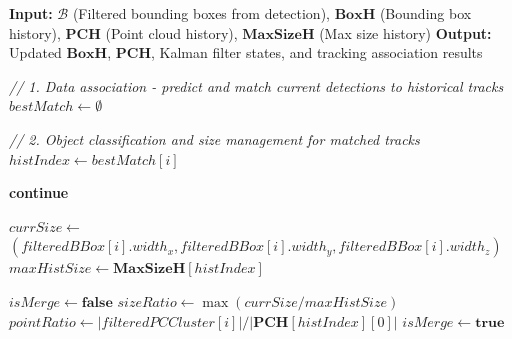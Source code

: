 \documentclass[14pt,a4paper]{article}
\begin{document}

\begin{algorithm}
\caption{Tracking (Multiple Model Kalman Filtering)}
\begin{algorithmic}[1]

\State \textbf{Input:} $\mathcal{B}$ (Filtered bounding boxes from detection), $\mathbf{BoxH}$ (Bounding box history), 
                        $\mathbf{PCH}$ (Point cloud history), $\mathbf{MaxSizeH}$ (Max size history)
\State \textbf{Output:} Updated $\mathbf{BoxH}$, $\mathbf{PCH}$, Kalman filter states, and tracking association results

\State \textit{// 1. Data association - predict and match current detections to historical tracks}
\State $bestMatch \gets \emptyset$
\State {}

\State \textit{// 2. Object classification and size management for matched tracks}
            \State $histIndex \gets bestMatch[i]$
            
                \State \textbf{continue}
            \EndIf
            
            \State $currSize \gets$ $(filteredBBox[i].width_x, filteredBBox[i].width_y, filteredBBox[i].width_z)$
            \State $maxHistSize \gets \mathbf{MaxSizeH}[histIndex]$
            
            \State $isMerge \gets \textbf{false}$
                \State $sizeRatio \gets \max(currSize / maxHistSize)$
                \State $pointRatio \gets |filteredPCCluster[i]| / |\mathbf{PCH}[histIndex][0]|$
                    \State $isMerge \gets \textbf{true}$
                \EndIf
            \EndIf
            

\end{algorithmic}
\end{algorithm}
\end{document}
